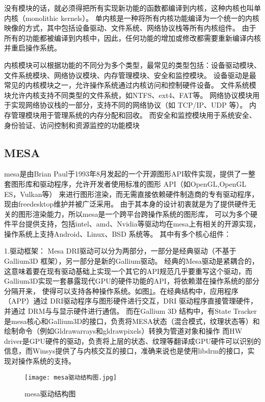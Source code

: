 没有模块的话，就必须得把所有实现新功能的函数都编译到内核，这种内核也叫单内核（monolithic kernels）。
单内核是一种将所有内核功能编译为一个统一的内核映像的方式，其中包括设备驱动、文件系统、网络协议栈等所有内核组件。
由于所有的功能都被编译到内核中，因此，任何功能的增加或修改都需要重新编译内核并重启操作系统。

内核模块可以根据功能的不同分为多个类型，最常见的类型包括：设备驱动模块、文件系统模块、网络协议模块、内存管理模块、安全和监控模块。
设备驱动是最常见的内核模块之一，允许操作系统通过内核访问和控制硬件设备。
文件系统模块允许内核支持不同类型的文件系统，如NTFS、ext4、FAT等。
网络协议模块用于实现网络协议栈的一部分，支持不同的网络协议（如 TCP/IP、UDP 等）。
内存管理模块用于管理系统的内存分配和回收。
而安全和监控模块用于系统安全、身份验证、访问控制和资源监控的功能模块

\subsection{MESA}
mesa\cite{mesa3d}是由Brian Paul于1993年8月发起的一个开源图形API软件实现，提供了一整套图形库和驱动程序，允许开发者使用标准的图形 API（如OpenGL,OpenGL ES，Vulkan等）
来进行图形渲染，而无需直接依赖硬件制造商的专有驱动程序，现由freedesktop维护并被广泛采用。
由于其本身的设计初衷就是为了提供硬件无关的图形渲染能力，所以mesa是一个跨平台跨操作系统的图形库，
可以为多个硬件平台提供支持，包括intel、amd、Nvidia等驱动均在mesa上有相关的开源实现，操作系统上支持Android、Linux、BSD 系统等。
其中有多个核心组件：

1.驱动框架：
Mesa DRI驱动可以分为两部分，一部分是经典驱动（不基于Gallium3D 框架），另一部分是新的Gallium驱动。
经典的Mesa驱动是紧耦合的，这意味着要在现有驱动基础上实现一个其它的API规范几乎要重写这个驱动，而Gallium3D实现一套暴露现代GPU的硬件功能的API，将依赖潜在操作系统的部分分隔开来，
使得可以支持各种操作系统。如图\ref{fig:mesa驱动结构图}。在经典结构中，应用程序（APP）通过 DRI驱动程序与图形硬件进行交互，DRI 驱动程序直接管理硬件，并通过 DRM与与显示硬件进行通信。
而在Gallium 3D 结构中，有State Tracker是mesa核心和Gallium3D的接口，负责将MESA状态（混合模式，纹理状态等）和绘制命令（例如Gldrawarrays和gldrawpixels）转换为管道对象和操作
而HW driver是GPU硬件的驱动，负责将上层的状态、纹理等翻译成GPU硬件可以识别的信息，而Winsys提供了与内核交互的接口，准确来说也是使用libdrm的接口，实现对操作系统的支持。

\begin{figure}[h]
  \centering
  \texttt{[image: mesa驱动结构图.jpg]}
  \caption{mesa驱动结构图}
  \label{fig:mesa驱动结构图}
\end{figure}

